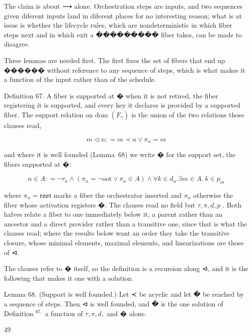 \documentclass[
  10
]{article}
\begin{document}
The claim is about ⟶ alone. Orchestration steps are inputs, and two
sequences given diferent inputs land in diferent places for no
interesting reason; what is at issue is whether the lifecycle rules,
which are nondeterministic in which fiber steps next and in which exit a
��������� fiber takes, can be made to disagree.

Three lemmas are needed first. The first fixes the set of fibers that
end up ������ without reference to any sequence of steps, which is what
makes it a function of the input rather than of the schedule.

Definition 67. A fiber is supported at � when it is not retired, the
fiber registering it is supported, and every key it declares is provided
by a supported fiber. The support relation on dom
\(\left( F _ { \gamma } \right)\) is the union of the two relations
those clauses read,

\[
m \triangleleft n : = m \prec n \vee \pi _ { n } = m\tag{62}
\]

and where it is well founded (Lemma~68) we write � for the support set,
the fibers supported at �:

\[
n \in A : = \lnot \tau _ { n } \land ( \pi _ { n } = \lnot \mathrm { o o t } \lor \pi _ { n } \in A ) \land \forall k \in d _ { n } . \exists m \in A . \ k \in p _ { m }\tag{63}
\]

where \(\pi _ { n } = \mathfrak { r o o t }\) marks a fiber the
orchestrator inserted and \(\pi _ { n }\) otherwise the fiber whose
activation registers �. The clauses read no field but
\(\tau , \pi , d , p\) . Both halves relate a fiber to one immediately
below it, a parent rather than an ancestor and a direct provider rather
than a transitive one, since that is what the clauses read; where the
results below want an order they take the transitive closure, whose
minimal elements, maximal elements, and linearizations are those of ⊲.

The clauses refer to � itself, so the definition is a recursion along ⊲,
and it is the following that makes it one with a solution.

Lemma 68. (Support is well founded.) Let ≺ be acyclic and let � be
reached by a sequence of steps. Then ⊲ is well founded, and � is the one
solution of Definition \(^ { 6 7 , }\) a function of
\(\tau , \pi , d ,\) and � alone.

49
\end{document}

